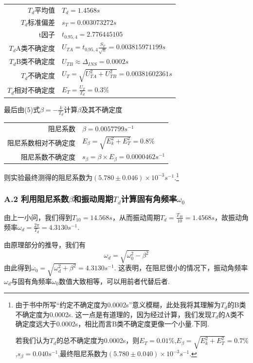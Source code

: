 \documentclass[UTF8]{ctexart}
\begin{document}
\begin{center}\begin{tabular}{r l}
{$T_{d}$平均值}& {$T_{d}=1.4568s$}\\
{$T_{d}$标准偏差}& {$s_T=0.003073272s$}\\
{t因子}& {$t_{0.95,4}=2.776445105$}\\
{$T_{d}$A类不确定度}& {$U_{TA}=t_{0.95,4}\frac{S_T}{\sqrt{n}}=0.003815971199s$}\\
{$T_{d}$B类不确定度}& {$U_{TB}\approx \Delta_{INS}=0.0002s$}\\
{$T_{d}$不确定度}&{$U_T=\sqrt{U_{TA}^2+U_{TB}^2}=0.00381602361s$}\\
{$T_{d}$相对不确定度}&{$E_T=\frac{U_T}{T_{d}}=0.3\%$}
\end{tabular}\end{center}
最后由(5)式$\beta=-\frac{k}{T_{d}}$计算$\beta$及其不确定度
\begin{center}\begin{tabular}{r l}
{阻尼系数}& {$\beta=0.0057799s^{-1}$}\\
{阻尼系数相对不确定度}&{$E_{\beta}=\sqrt{E_k^2+E_T^2}=0.8\%$}\\
{阻尼系数不确定度}&{$s_{\beta}=\beta\times E_{\beta}=0.0000462s^{-1}$}
\end{tabular}\end{center}
则实验最终测得的阻尼系数为$(5.780\pm0.046)\times10^{-3}s^{-1}$.\footnote{由于书中所写“约定不确定度为0.0002s”意义模糊，此处我将其理解为$T_d$的B类不确定度为0.0002s. 这一点是有道理的，因为经过计算，我们发现$T_d$的A类不确定度远大于0.0002s，相比而言B类不确定度更像一个小量.下同.\par 若我们认为$T_d$的总不确定度为0.0002s，则$E_T=0.01\%$,$E_{\beta}=\sqrt{E_k^2+E_T^2}=0.7\%$,$s_{\beta}=0.040s^{-1}$,最终阻尼系数为$(5.780\pm0.040)\times10^{-3}s^{-1}$.}
\subsubsection*{A.2 利用阻尼系数$\beta$和振动周期$T_d$计算固有角频率$\omega_0$}
由上一小问，我们得到$T_{10}=14.568s$，从而振动周期$T_d=\frac{T_{10}}{10}=1.4568s$，故振动角频率$\omega_d=\frac{2\pi}{T_d}=4.3130s^{-1}$.\par
由原理部分的推导，我们有
\begin{equation}
\omega_d=\sqrt{\omega_0^2-\beta^2}
\end{equation}
由此得到$\omega_0=\sqrt{\omega_d^2+\beta^2}=4.3130s^{-1}$. 这表明，在阻尼很小的情况下，振动角频率$\omega_d$与固有角频率$\omega_0$数值大致相等，可以用前者代替后者.
\end{document}
